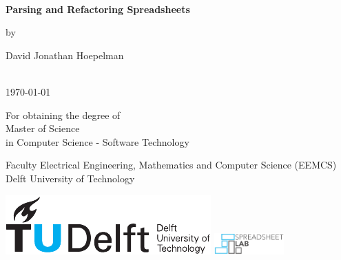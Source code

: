 \thispagestyle{empty}
\onecolumn
{%
\sffamily
\centering

~\vspace{\fill}

{\huge \bfseries
Parsing and Refactoring Spreadsheets
}

\vspace{2.0cm}

by

\vspace{2.0cm}

{\LARGE
David Jonathan Hoepelman
}

\vspace{3.0cm}

 \\
\today

\vspace{2.5cm}

For obtaining the degree of \\
Master of Science \\
in Computer Science - Software Technology \\

\vspace{0.5cm}

Faculty Electrical Engineering, Mathematics and Computer Science (EEMCS)\\
Delft University of Technology

\vspace{1.5cm}

\includegraphics{0-title/tudelft}
\hspace{0.5cm}
\includegraphics[height=8mm]{0-title/spreadsheet-lab}
\hspace{0.5cm}

\vspace{\fill}

}